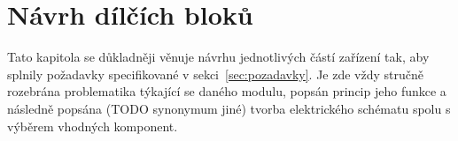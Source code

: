 \chapter{Návrh dílčích bloků}
\label{kap:navrh-dilnich-bloku}
    Tato kapitola se důkladněji věnuje návrhu jednotlivých částí zařízení tak, aby splnily požadavky specifikované v sekci~\ref{sec:pozadavky}. Je zde vždy stručně rozebrána problematika týkající se daného modulu, popsán princip jeho funkce a následně popsána (TODO synonymum jiné) tvorba elektrického schématu spolu s výběrem vhodných komponent.













